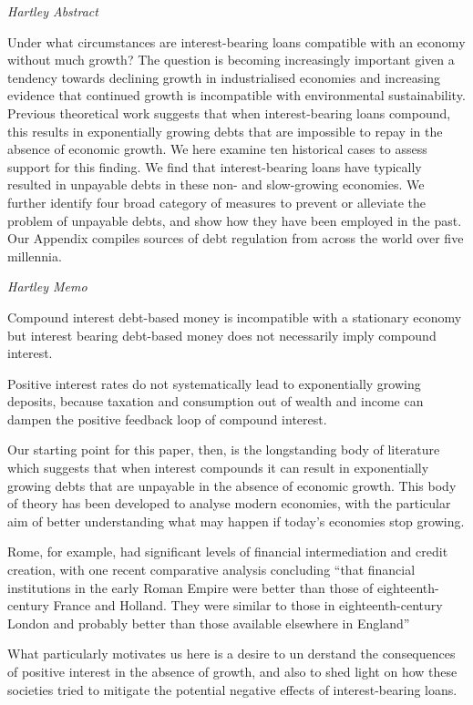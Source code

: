 \documentclass[
]{book}
\begin{document}
\emph{Hartley Abstract}

Under what circumstances are interest-bearing loans compatible with an economy without much growth? The question is becoming increasingly important given a tendency towards declining growth in industrialised economies and increasing evidence that continued growth is incompatible with environmental sustainability. Previous theoretical work suggests that when interest-bearing loans compound, this results in exponentially growing debts that are impossible to repay in the absence of economic growth. We here examine ten historical cases to assess support for this finding. We find that interest-bearing loans have typically resulted in unpayable debts in these non- and slow-growing economies. We further identify four broad category of measures to prevent or alleviate the problem of unpayable debts, and show how they have been employed in the past. Our Appendix compiles sources of debt regulation from across the world over five millennia.

\emph{Hartley Memo}

Compound interest debt-based money is incompatible with a
stationary economy but interest bearing debt-based money does not
necessarily imply compound interest.

Positive interest
rates do not systematically lead to exponentially growing deposits,
because taxation and consumption out of wealth and income can
dampen the positive feedback loop of compound interest.

Our starting point for this paper, then, is the longstanding body of
literature which suggests that when interest compounds it can result in
exponentially growing debts that are unpayable in the absence of
economic growth. This body of theory has been developed to analyse
modern economies, with the particular aim of better understanding
what may happen if today's economies stop growing.

Rome,
for example, had significant levels of financial intermediation and credit
creation, with one recent comparative analysis concluding ``that financial
institutions in the early Roman Empire were better than those of
eighteenth- century France and Holland. They were similar to those in
eighteenth-century London and probably better than those available
elsewhere in England''

What particularly motivates us here is a desire to un­
derstand the consequences of positive interest in the absence of growth,
and also to shed light on how these societies tried to mitigate the
potential negative effects of interest-bearing loans.
\end{document}
